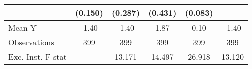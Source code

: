 {\begin{tabular}{l*{5}{c}}
            &     (0.150)         &     (0.287)         &     (0.431)         &     (0.083)         &                     \\
\midrule
Mean Y      &       -1.40         &       -1.40         &        1.87         &        0.10         &       -1.40         \\
Observations&         399         &         399         &         399         &         399         &         399         \\
Exc. Inst. F-stat&                     &      13.171         &      14.497         &      26.918         &      13.120         \\
\bottomrule
\end{tabular}
}
